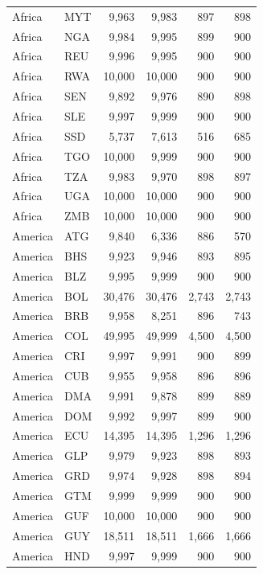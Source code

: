 \documentclass[12pt,]{article}
\begin{document}
\begin{longtable}[t]{llrrrr}
Africa & MYT & 9,963 & 9,983 & 897 & 898\\
\rowcolor{gray!6}  Africa & NGA & 9,984 & 9,995 & 899 & 900\\
Africa & REU & 9,996 & 9,995 & 900 & 900\\
\rowcolor{gray!6}  Africa & RWA & 10,000 & 10,000 & 900 & 900\\
Africa & SEN & 9,892 & 9,976 & 890 & 898\\
\rowcolor{gray!6}  Africa & SLE & 9,997 & 9,999 & 900 & 900\\
Africa & SSD & 5,737 & 7,613 & 516 & 685\\
\rowcolor{gray!6}  Africa & TGO & 10,000 & 9,999 & 900 & 900\\
Africa & TZA & 9,983 & 9,970 & 898 & 897\\
\rowcolor{gray!6}  Africa & UGA & 10,000 & 10,000 & 900 & 900\\
Africa & ZMB & 10,000 & 10,000 & 900 & 900\\
\rowcolor{gray!6}  America & ATG & 9,840 & 6,336 & 886 & 570\\
America & BHS & 9,923 & 9,946 & 893 & 895\\
\rowcolor{gray!6}  America & BLZ & 9,995 & 9,999 & 900 & 900\\
America & BOL & 30,476 & 30,476 & 2,743 & 2,743\\
\rowcolor{gray!6}  America & BRB & 9,958 & 8,251 & 896 & 743\\
America & COL & 49,995 & 49,999 & 4,500 & 4,500\\
\rowcolor{gray!6}  America & CRI & 9,997 & 9,991 & 900 & 899\\
America & CUB & 9,955 & 9,958 & 896 & 896\\
\rowcolor{gray!6}  America & DMA & 9,991 & 9,878 & 899 & 889\\
America & DOM & 9,992 & 9,997 & 899 & 900\\
\rowcolor{gray!6}  America & ECU & 14,395 & 14,395 & 1,296 & 1,296\\
America & GLP & 9,979 & 9,923 & 898 & 893\\
\rowcolor{gray!6}  America & GRD & 9,974 & 9,928 & 898 & 894\\
America & GTM & 9,999 & 9,999 & 900 & 900\\
\rowcolor{gray!6}  America & GUF & 10,000 & 10,000 & 900 & 900\\
America & GUY & 18,511 & 18,511 & 1,666 & 1,666\\
\rowcolor{gray!6}  America & HND & 9,997 & 9,999 & 900 & 900\\

\end{longtable}
\end{document}
